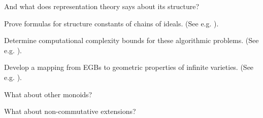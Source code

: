 \begin{question}
And what does representation theory says about its structure?  \cite{}
\end{question}


\begin{problem}
Prove formulas for structure constants of chains of ideals.  (See e.g. \cite{KKL:equivariant-markov, Hillar13, hillar2016corrigendum}).
\end{problem}


\begin{problem}
Determine computational complexity bounds for these algorithmic problems.  (See e.g. \cite{yap2000fundamental}).
\end{problem}


\begin{problem}
Develop a mapping from EGBs to geometric properties of infinite varieties.  (See e.g. \cite{Nagel, krone2016hilbert}).
\end{problem}

\begin{question}
What about other monoids?
\end{question}


\begin{question}
What about non-commutative extensions?  \cite{shirshov1962some, bokut1976embeddings, bergman1978diamond, la2009letterplace}
\end{question}



